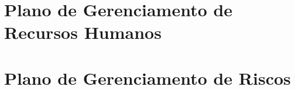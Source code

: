 \begin{anexosenv}
 

\chapter{Plano de Gerenciamento de Recursos Humanos}

  
  
\chapter{Plano de Gerenciamento de Riscos}

  

  
\end{anexosenv}

